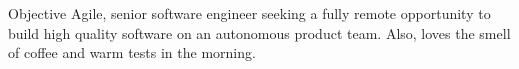 \begin{section}{Objective}
  Agile, senior software engineer seeking a fully remote opportunity to build high quality software on an autonomous product team. Also, loves the smell of coffee and warm tests in the morning.
\end{section}
